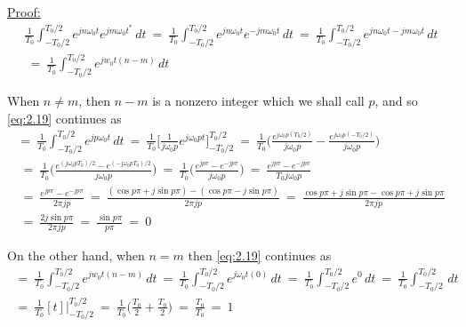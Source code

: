 \documentclass[10pt]{article}
\begin{document}
\hspace{1cm}

\noindent
\underline{Proof:}
\begin{equation}   \label{eq:2.19}
\begin{aligned}
    \frac{1}{T_0}\int_{-T_0/2}^{T_0/2} e^{jn\omega_0t} e^{jm\omega_0t^{\ast}} \,dt \: = \:
    \frac{1}{T_0}\int_{-T_0/2}^{T_0/2} e^{jn\omega_0t} e^{-jm\omega_0t} \,dt \: = \:
    \frac{1}{T_0}\int_{-T_0/2}^{T_0/2} e^{jn\omega_0t-jm\omega_0t} \,dt \\
    \: = \: \frac{1}{T_0}\int_{-T_0/2}^{T_0/2} e^{jw_0t(n-m)} \,dt
\end{aligned}
\end{equation}

\noindent
When $n \neq m$, then $n - m$ is a nonzero integer which we shall call $p$, and so \eqref{eq:2.19} continues as
\begin{equation} \label{eq:2.20}
\begin{aligned}
    = \: 
    \frac{1}{T_0}\int_{-T_0/2}^{T_0/2} e^{jp\omega_0t} \,dt \: = \:
    \frac{1}{T_0}\Big[\frac{1}{j\omega_0p} e^{j\omega_0pt}\Big]_{-T_0/2}^{T_0/2} \: = \:
    \frac{1}{T_0}\Big(\frac{e^{j\omega_0p(T_0/2)}}{j\omega_0p} - \frac{e^{j\omega_0p(-T_0/2)}}{j\omega_0p}\Big) \\
    \: = \: \frac{1}{T_0}\Big(\frac{e^{(j\omega_0pT_0)/2}-e^{(-j\omega_0pT_0)/2}}{j\omega_0p}\Big) \: = \: \frac{1}{T_0}\Big(\frac{e^{jp\pi}-e^{-jp\pi}}{j\omega_0p}\Big) \: = \: \frac{e^{jp\pi}-e^{-jp\pi}}{T_0j\omega_0p} \\
    \: = \: \frac{e^{jp\pi}-e^{-jp\pi}}{2\pi j p} \: = \: \frac{(\cos{p\pi}+j\sin{p\pi}) - (\cos{p\pi}-j\sin{p\pi})}{2 \pi j p} \: = \: \frac{\cos{p\pi}+j\sin{p\pi}-\cos{p\pi}+j\sin{p\pi}}{2 \pi j p} \\
    \: = \: \frac{2j\sin{p\pi}}{2\pi j p} \: = \: \frac{\sin{p\pi}}{p\pi} \: = \: 0
\end{aligned}
\end{equation}

\noindent
On the other hand, when $n = m$ then \eqref{eq:2.19} continues as
\begin{equation} \label{eq:2.21}
\begin{aligned}
    \: = \: \frac{1}{T_0}\int_{-T_0/2}^{T_0/2} e^{jw_0t(n-m)} \,dt \: = \: \frac{1}{T_0}\int_{-T_0/2}^{T_0/2} e^{j\omega_0t(0)} \,dt \: = \: \frac{1}{T_0}\int_{-T_0/2}^{T_0/2} e^{0} \,dt  \: = \: 
    \frac{1}{T_0}\int_{-T_0/2}^{T_0/2} \,dt \\
    \: = \: \frac{1}{T_0}[t]\Big|_{-T_0/2}^{T_0/2} \: = \: \frac{1}{T_0}\Big(\frac{T_0}{2} + \frac{T_0}{2}\Big) \: = \: \frac{T_0}{T_0} \: = \: 1
\end{aligned}
\end{equation}
\end{document}
